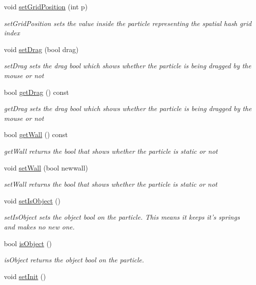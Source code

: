 \begin{DoxyCompactItemize}
void \hyperlink{classParticle_a4cb304dc5863a08d7f3d1c456bccb598}{set\-Grid\-Position} (int p)
\begin{DoxyCompactList}\small\item\em set\-Grid\-Position sets the value inside the particle representing the spatial hash grid index \end{DoxyCompactList}\item 
void \hyperlink{classParticle_aa715f6f18f8257fb31a7755c18cfda22}{set\-Drag} (bool drag)
\begin{DoxyCompactList}\small\item\em set\-Drag sets the drag bool which shows whether the particle is being dragged by the mouse or not \end{DoxyCompactList}\item 
bool \hyperlink{classParticle_a57c96039de3e090bfd9fc3fcc5923ab0}{get\-Drag} () const 
\begin{DoxyCompactList}\small\item\em get\-Drag sets the drag bool which shows whether the particle is being dragged by the mouse or not \end{DoxyCompactList}\item 
bool \hyperlink{classParticle_af8a2db33e42e0e4ed3da7dfe04e67b05}{get\-Wall} () const 
\begin{DoxyCompactList}\small\item\em get\-Wall returns the bool that shows whether the particle is static or not \end{DoxyCompactList}\item 
void \hyperlink{classParticle_a930c48cf6e8fe1212409f92c68774e0f}{set\-Wall} (bool newwall)
\begin{DoxyCompactList}\small\item\em set\-Wall returns the bool that shows whether the particle is static or not \end{DoxyCompactList}\item 
\hypertarget{classParticle_a96d696c7db5c7f96ee2d5d9fae5cee52}{void \hyperlink{classParticle_a96d696c7db5c7f96ee2d5d9fae5cee52}{set\-Is\-Object} ()}\label{classParticle_a96d696c7db5c7f96ee2d5d9fae5cee52}

\begin{DoxyCompactList}\small\item\em set\-Is\-Object sets the object bool on the particle. This means it keeps it's springs and makes no new one. \end{DoxyCompactList}\item 
bool \hyperlink{classParticle_aa4b116b621e88c3dd422520d6631e6d9}{is\-Object} ()
\begin{DoxyCompactList}\small\item\em is\-Object returns the object bool on the particle. \end{DoxyCompactList}\item 
\hypertarget{classParticle_a65da6bc58018b897087371b3db4606e9}{void \hyperlink{classParticle_a65da6bc58018b897087371b3db4606e9}{set\-Init} ()}\label{classParticle_a65da6bc58018b897087371b3db4606e9}


\end{DoxyCompactItemize}
